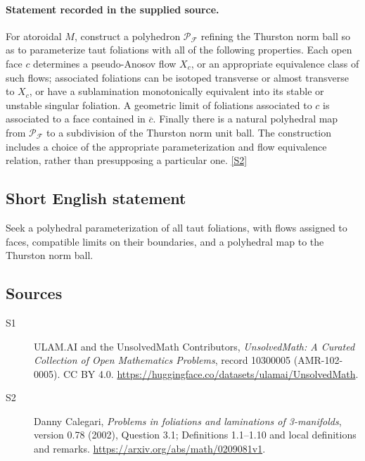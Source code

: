 \documentclass[11pt]{article}
\newcommand{\sref}[2]{\hyperlink{source:#1:#2}{[S#2]}}
\begin{document}
\paragraph{Statement recorded in the supplied source.}
For atoroidal $M$, construct a polyhedron $\mathscr P_{\mathcal F}$ refining the Thurston norm ball so as to parameterize taut foliations with all of the following properties. Each open face $c$ determines a pseudo-Anosov flow $X_c$, or an appropriate equivalence class of such flows; associated foliations can be isotoped transverse or almost transverse to $X_c$, or have a sublamination monotonically equivalent into its stable or unstable singular foliation. A geometric limit of foliations associated to $c$ is associated to a face contained in $\overline c$. Finally there is a natural polyhedral map from $\mathscr P_{\mathcal F}$ to a subdivision of the Thurston norm unit ball. The construction includes a choice of the appropriate parameterization and flow equivalence relation, rather than presupposing a particular one. \sref{10300005}{2}
\subsection{Short English statement}
Seek a polyhedral parameterization of all taut foliations, with flows assigned to faces, compatible limits on their boundaries, and a polyhedral map to the Thurston norm ball.
\subsection{Sources}
\begin{description}
\item[\hypertarget{source:10300005:1}{S1}] ULAM.AI and the UnsolvedMath Contributors, \emph{UnsolvedMath: A Curated Collection of Open Mathematics Problems}, record 10300005 (AMR-102-0005). CC BY 4.0. \url{https://huggingface.co/datasets/ulamai/UnsolvedMath}.
\item[\hypertarget{source:10300005:2}{S2}] Danny Calegari, \emph{Problems in foliations and laminations of 3-manifolds}, version 0.78 (2002), Question 3.1; Definitions 1.1--1.10 and local definitions and remarks. \url{https://arxiv.org/abs/math/0209081v1}.
\end{description}
\label{end:10300005}
\end{document}
